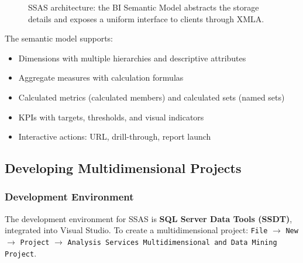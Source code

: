 \begin{figure}[h]
\caption{SSAS architecture: the BI Semantic Model abstracts the storage details and exposes a uniform interface to clients through XMLA.}
\label{fig:ssas-architecture}
\end{figure}

The semantic model supports:
\begin{itemize}
    \item Dimensions with multiple hierarchies and descriptive attributes
    \item Aggregate measures with calculation formulas
    \item Calculated metrics (calculated members) and calculated sets (named sets)
    \item KPIs with targets, thresholds, and visual indicators
    \item Interactive actions: URL, drill-through, report launch
\end{itemize}

\subsection{Developing Multidimensional Projects}
\label{sec:ssas-development}

\subsubsection{Development Environment}
\label{subsec:ssas-dev-environment}

The development environment for SSAS is \textbf{SQL Server Data Tools (SSDT)}, integrated into Visual Studio. To create a multidimensional project: \texttt{File} $\rightarrow$ \texttt{New} $\rightarrow$ \texttt{Project} $\rightarrow$ \texttt{Analysis Services Multidimensional and Data Mining Project}.

